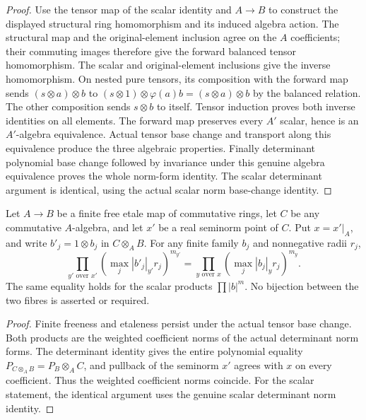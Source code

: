 \begin{proof}
Use the tensor map of the scalar identity and $A\to B$ to construct
the displayed structural ring homomorphism and its induced algebra action.
The structural map and the original-element inclusion agree on the
$A$ coefficients; their commuting images therefore give the forward
balanced tensor homomorphism. The scalar and original-element inclusions
give the inverse homomorphism. On nested pure tensors, its composition
with the forward map sends $(s\otimes a)\otimes b$ to
$(s\otimes1)\otimes\varphi(a)b=(s\otimes a)\otimes b$ by the balanced
relation. The other composition sends $s\otimes b$ to itself.
Tensor induction proves both inverse identities on all elements.
The forward map preserves every $A'$ scalar, hence is an $A'$-algebra
equivalence. Actual tensor base change and transport along this equivalence
produce the three algebraic properties. Finally determinant polynomial
base change followed by invariance under this genuine algebra equivalence
proves the whole norm-form identity. The scalar determinant argument is
identical, using the actual scalar norm base-change identity.
\end{proof}

\begin{theorem}
\label{spectrum:etale-norm-products-base-change}
\leanok
{}
Let $A\to B$ be a finite free etale map of commutative rings, let $C$
be any commutative $A$-algebra, and let $x'$ be a real seminorm point
of $C$. Put $x=x'|_A$, and write $b'_j=1\otimes b_j$ in $C\otimes_A B$.
For any finite family $b_j$ and nonnegative radii $r_j$,
\[
 \prod_{y'\text{ over }x'}
 \left(\max_j |b'_j|_{y'}r_j\right)^{m_{y'}}
 =
 \prod_{y\text{ over }x}
 \left(\max_j |b_j|_y r_j\right)^{m_y}.
\]
The same equality holds for the scalar products $\prod|b|^m$.
No bijection between the two fibres is asserted or required.
\end{theorem}
\begin{proof}
Finite freeness and etaleness persist under the actual tensor base
change. Both products are the weighted coefficient norms of the actual
determinant norm forms. The determinant identity gives the entire
polynomial equality $P_{C\otimes_A B}=P_B\otimes_A C$, and pullback of
the seminorm $x'$ agrees with $x$ on every coefficient. Thus the weighted
coefficient norms coincide. For the scalar statement, the identical
argument uses the genuine scalar determinant norm identity.
\end{proof}

